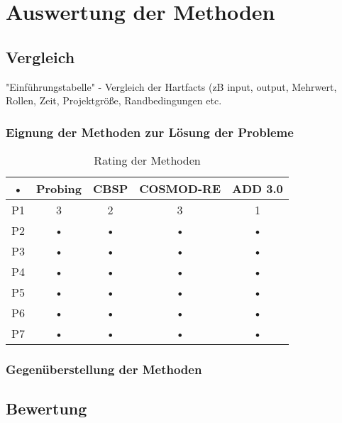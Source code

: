 \section{Auswertung der Methoden}

\subsection{Vergleich}

"Einführungstabelle" - Vergleich der Hartfacts (zB input, output, Mehrwert, Rollen, Zeit, Projektgröße, Randbedingungen etc. \\

\subsubsection{Eignung der Methoden zur Lösung der Probleme}

\begin{table}[h] %
\caption{Rating der Methoden}
\centering
\begin{tabular}{|c|c|c|c|c|}
\hline 
\rule[-1ex]{0pt}{2.5ex} • & Probing & CBSP & COSMOD-RE & ADD 3.0 \\ 
\hline 
\rule[-1ex]{0pt}{2.5ex} P1 & 3 & 2 & 3 & 1 \\ 
\hline 
\rule[-1ex]{0pt}{2.5ex}  P2 & • & • & • & • \\ 
\hline 
\rule[-1ex]{0pt}{2.5ex} P3 & • & • & • & • \\ 
\hline 
\rule[-1ex]{0pt}{2.5ex} P4 & • & • & • & • \\ 
\hline 
\rule[-1ex]{0pt}{2.5ex} P5 & • & • & • & • \\ 
\hline 
\rule[-1ex]{0pt}{2.5ex} P6 & • & • & • & • \\ 
\hline 
\rule[-1ex]{0pt}{2.5ex} P7 & • & • & • & • \\ 
\hline 
\end{tabular} 
\label{tab:eignung_der_methoden}
\end{table}






\subsubsection{Gegenüberstellung der Methoden}





\subsection{Bewertung}